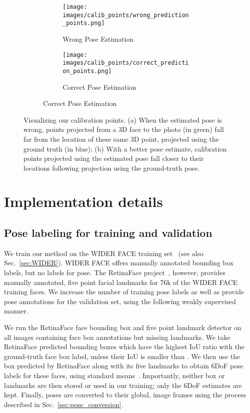 \documentclass[final]{cvpr}
\begin{document}
\begin{figure}
    \begin{subfigure}[b]{0.475\textwidth}
        \begin{subfigure}[b]{0.495\textwidth}
            \centering
            \texttt{[image: images/calib\_points/wrong\_prediction\_points.png]}
            \caption{Wrong Pose Estimation}
        \end{subfigure}
        \hfill
            \begin{subfigure}[b]{0.495\textwidth}
            \centering
            \texttt{[image: images/calib\_points/correct\_prediction\_points.png]}
            \caption{Correct Pose Estimation}
        \end{subfigure}
    \end{subfigure}\vspace{-2mm}
    \caption{Visualizing our calibration points. (a) When the estimated pose is wrong, points projected from a 3D face to the photo (in green) fall far from the location of these same 3D point, projected using the ground truth (in blue); (b) With a better pose estimate, calibration points projected using the estimated pose fall closer to their locations following projection using the ground-truth pose.\vspace{-2mm}}
    \label{fig:calibpoints}
\end{figure}

\section{Implementation details}
\subsection{Pose labeling for training and validation}\label{sec:trainingdata}
We train our method on the WIDER FACE training set~\cite{wider_face} (see also Sec.~\ref{sec:WIDER}). WIDER FACE offers manually annotated bounding box labels, but no labels for pose. The RetinaFace project~\cite{retinaface}, however, provides manually annotated, five point facial landmarks for 76k of the WIDER FACE training faces. We increase the number of training pose labels as well as provide pose annotations for the validation set, using the following weakly supervised manner. 


We run the RetinaFace face bounding box and five point landmark detector on all images containing face box annotations but missing landmarks. We take RetinaFace predicted bounding boxes which have the highest IoU ratio with the ground-truth face box label, unless their IoU is smaller than . We then use the box predicted by RetinaFace along with its five landmarks to obtain 6DoF pose labels for these faces, using standard means~\cite{posit, epnp}. Importantly, neither box or landmarks are then stored or used in our training; only the 6DoF estimates are kept. Finally, poses are converted to their global, image frames using the process described in Sec.~\ref{sec:pose_conversion}. 
\end{document}
